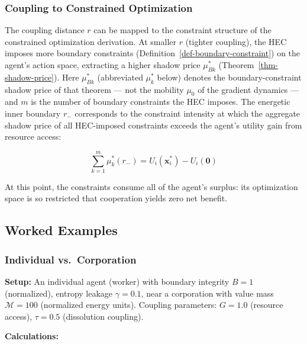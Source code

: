 \documentclass[11pt]{article}
\theoremstyle{plain}
\theoremstyle{definition}
\theoremstyle{remark}
\let\origsubsection\subsection
\renewcommand{\subsection}{\needspace{7\baselineskip}\origsubsection}
\let\origsubsubsection\subsubsection
\renewcommand{\subsubsection}{\needspace{4\baselineskip}\origsubsubsection}
\begin{document}
\subsubsection{Coupling to Constrained
Optimization}\label{coupling-to-constrained-optimization}

The coupling distance \(r\) can be mapped to the constraint structure of
the constrained optimization derivation. At smaller \(r\) (tighter
coupling), the HEC imposes more boundary constraints
(Definition~\ref{def-boundary-constraint}) on the agent's action space,
extracting a higher shadow price \(\mu_{Bk}^*\)
(Theorem~\ref{thm-shadow-price}). Here \(\mu_{Bk}^*\) (abbreviated
\(\mu_k^*\) below) denotes the boundary-constraint shadow price of that
theorem --- not the mobility \(\mu_0\) of the gradient dynamics --- and
\(m\) is the number of boundary constraints the HEC imposes. The
energetic inner boundary \(r_-\) corresponds to the constraint intensity
at which the aggregate shadow price of all HEC-imposed constraints
exceeds the agent's utility gain from resource access:

\[\sum_{k=1}^{m} \mu_k^*(r_-) = U_i(\mathbf{x}_i^*) - U_i(\mathbf{0})\]

At this point, the constraints consume all of the agent's surplus: its
optimization space is so restricted that cooperation yields zero net
benefit.

\subsection{Worked Examples}\label{worked-examples-3}

\subsubsection{Individual
vs.~Corporation}\label{individual-vs.-corporation}

\textbf{Setup:} An individual agent (worker) with boundary integrity
\(B = 1\) (normalized), entropy leakage \(\gamma = 0.1\), near a
corporation with value mass \(\mathcal{M} = 100\) (normalized energy
units). Coupling parameters: \(G = 1.0\) (resource access),
\(\tau = 0.5\) (dissolution coupling).

\textbf{Calculations:}
\end{document}
